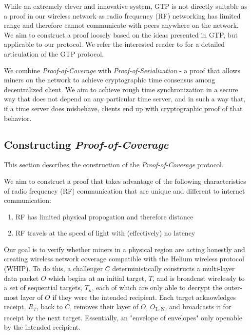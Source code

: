 \documentclass[letterpaper,11pt]{article}
\def\proofofcoverage/{\textit{Proof-of-Coverage}}
\begin{document}
While an extremely clever and innovative system, GTP is not directly suitable as a proof in our wireless network as radio frequency (RF) networking has limited range and therefore cannot communicate with peers anywhere on the network. We aim to construct a proof loosely based on the ideas presented in GTP, but applicable to our protocol. We refer the interested reader to \cite{gtp} for a detailed articulation of the GTP protocol.\newline

We combine \proofofcoverage/ with \textit{Proof-of-Serialization} - a proof that allows miners on the network to achieve cryptographic time consensus among decentralized client. We aim to achieve rough time synchronization in a secure way that does not depend on any particular time server, and in such a way that, if a time server does misbehave, clients end up with cryptographic proof of that behavior.

\subsection{Constructing \proofofcoverage/}

This section describes the construction of the \proofofcoverage/ protocol.\newline

We aim to construct a proof that takes advantage of the following characteristics of radio frequency (RF) communication that are unique and different to internet communication:

\begin{enumerate}
	\item RF has limited physical propogation and therefore distance
	\item RF travels at the speed of light with (effectively) no latency
\end{enumerate}

Our goal is to verify whether miners in a physical region are acting honestly and creating wireless network coverage compatible with the Helium wireless protocol (WHIP). To do this, a challenger $\mathit{C}$ deterministically constructs a multi-layer data packet $\mathit{O}$ which begins at an initial target, $\mathit{T}$, and is broadcast wirelessly to a set of sequential targets, $\mathit{T_n}$, each of which are only able to decrypt the outer-most layer of $\mathit{O}$ if they were the intended recipient. Each target acknowledges receipt, $\mathit{R_T}$, back to $\mathit{C}$, removes their layer of $\mathit{O}$, $\mathit{O}$\textsubscript{L-N}, and broadcasts it for receipt by the next target. Essentially, an "envelope of envelopes" only openable by the intended recipient.\newline
\end{document}
